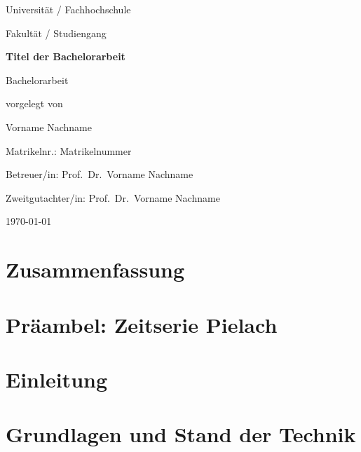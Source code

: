 \documentclass[12pt, a4paper, bibliography=totoc, listof=totoc]{scrreprt}
\newcommand{\thesistitle}{Titel der Bachelorarbeit}
\newcommand{\authorname}{Vorname Nachname}
\newcommand{\matrikelnr}{Matrikelnummer}
\newcommand{\university}{Universität / Fachhochschule}
\newcommand{\faculty}{Fakultät / Studiengang}
\newcommand{\supervisor}{Betreuer/in: Prof.\ Dr.\ Vorname Nachname}
\newcommand{\secondreviewer}{Zweitgutachter/in: Prof.\ Dr.\ Vorname Nachname}
\newcommand{\submissiondate}{\today}
\begin{document}
\begin{titlepage}
    \centering
    \vspace*{2cm}
    {\Large \university \par}
    \vspace{0.5cm}
    {\large \faculty \par}
    \vspace{3cm}
    {\LARGE \textbf{\thesistitle} \par}
    \vspace{2cm}
    {\large Bachelorarbeit \par}
    \vspace{1cm}
    {\large vorgelegt von \par}
    \vspace{0.5cm}
    {\Large \authorname \par}
    {\normalsize Matrikelnr.: \matrikelnr \par}
    \vfill
    {\normalsize \supervisor \par}
    {\normalsize \secondreviewer \par}
    \vspace{1cm}
    {\normalsize \submissiondate \par}
\end{titlepage}

\chapter*{Zusammenfassung}


\tableofcontents
\newpage


\setcounter{chapter}{-1}
\chapter{Präambel: Zeitserie Pielach}

\chapter{Einleitung}

\chapter{Grundlagen und Stand der Technik}
\end{document}

